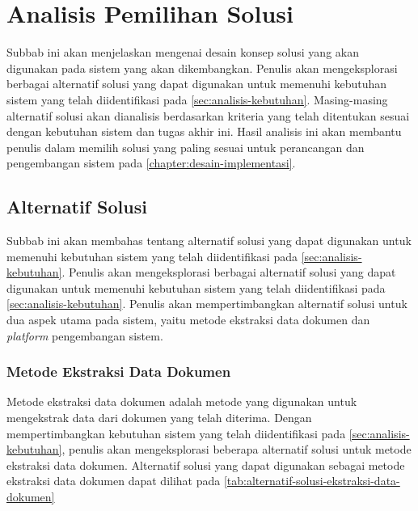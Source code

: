 \section{Analisis Pemilihan Solusi}
\label{sec:analisis-pemilihan-solusi}

Subbab ini akan menjelaskan mengenai desain konsep solusi yang akan digunakan pada sistem yang akan dikembangkan. Penulis akan mengeksplorasi berbagai alternatif solusi yang dapat digunakan untuk memenuhi kebutuhan sistem yang telah diidentifikasi pada \autoref{sec:analisis-kebutuhan}. Masing-masing alternatif solusi akan dianalisis berdasarkan kriteria yang telah ditentukan sesuai dengan kebutuhan sistem dan tugas akhir ini. Hasil analisis ini akan membantu penulis dalam memilih solusi yang paling sesuai untuk perancangan dan pengembangan sistem pada \autoref{chapter:desain-implementasi}.

\subsection{Alternatif Solusi}
\label{subsec:alternatif-solusi}
Subbab ini akan membahas tentang alternatif solusi yang dapat digunakan untuk memenuhi kebutuhan sistem yang telah diidentifikasi pada \autoref{sec:analisis-kebutuhan}. Penulis akan mengeksplorasi berbagai alternatif solusi yang dapat digunakan untuk memenuhi kebutuhan sistem yang telah diidentifikasi pada \autoref{sec:analisis-kebutuhan}. Penulis akan mempertimbangkan alternatif solusi untuk dua aspek utama pada sistem, yaitu metode ekstraksi data dokumen dan \emph{platform} pengembangan sistem. 

\subsubsection{Metode Ekstraksi Data Dokumen}
\label{subsubsec:model-ekstraksi-data-dokumen}
Metode ekstraksi data dokumen adalah metode yang digunakan untuk mengekstrak data dari dokumen yang telah diterima. Dengan mempertimbangkan kebutuhan sistem yang telah diidentifikasi pada \autoref{sec:analisis-kebutuhan}, penulis akan mengeksplorasi beberapa alternatif solusi untuk metode ekstraksi data dokumen. Alternatif solusi yang dapat digunakan sebagai metode ekstraksi data dokumen dapat dilihat pada \autoref{tab:alternatif-solusi-ekstraksi-data-dokumen}

